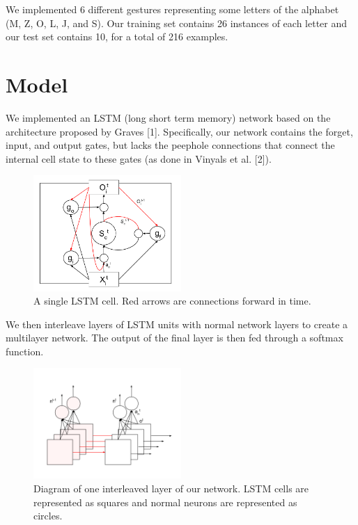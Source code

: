 \documentclass[11pt]{article}
\begin{document}
We implemented 6 different gestures representing some letters of
the alphabet (M, Z, O, L, J, and S). Our training set contains
26 instances of each letter and our test set contains 10, for
a total of 216 examples. 

\section{Model}
\label{sect:pdf}

We implemented an LSTM (long short term memory) network based on
the architecture proposed by Graves [1]. Specifically,
our network contains the forget, input, and output gates, but lacks the
peephole connections that connect the internal cell state to these gates
(as done in Vinyals et al. [2]).

\begin{figure}[ht]
\caption{A single LSTM cell. Red arrows are connections forward in time.}
  \centering
    \includegraphics[width=0.5\textwidth]{lstm_cell}
\end{figure}

We then interleave layers of LSTM units with
normal network layers to create a multilayer network.
The output of the final layer is then fed through a softmax function.

\begin{figure}[ht]
\caption{Diagram of one interleaved layer of our network. LSTM 
cells are represented as squares and normal neurons are represented
as circles.}
  \centering
    \includegraphics[width=0.5\textwidth]{lstm_network}
\end{figure}
\end{document}
